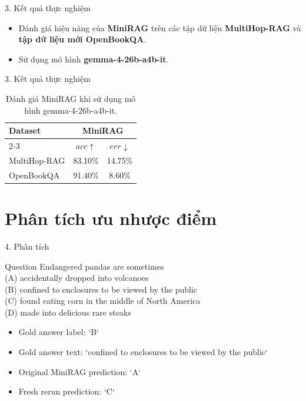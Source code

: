 \documentclass[11pt]{beamer}
\begin{document}
    \begin{frame}{3. Kết quả thực nghiệm}
        \begin{itemize}
            \item Đánh giá hiệu năng của \textbf{MiniRAG} trên các tập dữ liệu \textbf{MultiHop-RAG} và \textbf{tập dữ liệu mới OpenBookQA}.
            \item Sử dụng mô hình \textbf{gemma-4-26b-a4b-it}.
        \end{itemize}
    \end{frame}

    \begin{frame}{3. Kết quả thực nghiệm}
    \begin{table}[t]
    \centering
    \small
    \setlength{\tabcolsep}{18pt}
    \renewcommand{\arraystretch}{1.15}

    \begin{tabular}{lcc}
    \toprule
    \textbf{Dataset}
    & \multicolumn{2}{c}{MiniRAG} \\

    \cmidrule(lr){2-3}

    & $acc \uparrow$ & $err \downarrow$ \\

    \midrule
    MultiHop-RAG
    & 83.10\%  & 14.75\% \\


    OpenBookQA
    & 91.40\% & 8.60\% \\

    \bottomrule
    \end{tabular}
    \caption{Đánh giá MiniRAG khi sử dụng mô hình gemma-4-26b-a4b-it.}
    \end{table}
\end{frame}

\section{Phân tích ưu nhược điểm}

\begin{frame}{4. Phân tích}
\begin{block}{Question}
    Endangered pandas are sometimes \\
(A) accidentally dropped into volcanoes \\
(B) confined to enclosures to be viewed by the public \\
(C) found eating corn in the middle of North America \\
(D) made into delicious rare steaks
\end{block}

\begin{itemize}
\item Gold answer label: `B`
\item Gold answer text: `confined to enclosures to be viewed by the public`
\item Original MiniRAG prediction: `A`
\item Fresh rerun prediction: `C`
\end{itemize}
\end{frame}
\end{document}
